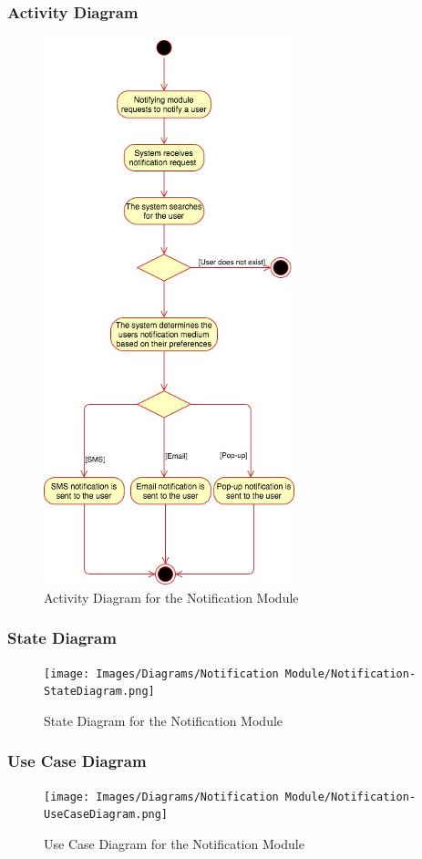 \documentclass[runningheads,a4paper]{article}
\begin{document}
\subsubsection{Activity Diagram}
\begin{figure}[H]
   	\centering
   	\includegraphics{Images/Diagrams/Notification Module/ActivityDiagram.png}
   	\caption{Activity Diagram for the Notification Module}
\end{figure}

\subsubsection{State Diagram}
\begin{figure}[H]
   	\centering
   	\texttt{[image: Images/Diagrams/Notification Module/Notification-StateDiagram.png]}
   	\caption{State Diagram for the Notification Module}
\end{figure}

\subsubsection{Use Case Diagram}
\begin{figure}[H]
   	\centering
   	\texttt{[image: Images/Diagrams/Notification Module/Notification-UseCaseDiagram.png]}
   	\caption{Use Case Diagram for the Notification Module}
\end{figure}
\end{document}
